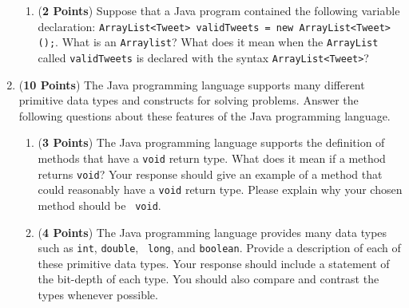 \documentclass[12pt]{article}
\begin{document}
\begin{enumerate}
\begin{enumerate}

% 

\item ({\bf 2 Points}) Suppose that a Java program contained the
  following variable declaration: {\tt ArrayList<Tweet> validTweets =
    new ArrayList<Tweet>();}.  What is an {\tt Arraylist}?  What does
  it mean when the {\tt ArrayList} called {\tt validTweets} is
  declared with the syntax {\tt ArrayList<Tweet>}?

\end{enumerate}

\newpage

\item ({\bf 10 Points}) The Java programming language supports many
  different primitive data types and constructs for solving problems.
  Answer the following questions about these features of the Java
  programming language.

\begin{enumerate}

\item ({\bf 3 Points}) The Java programming language supports the
  definition of methods that have a {\tt void} return type.  What does
  it mean if a method returns {\tt void}?  Your response should give
  an example of a method that could reasonably have a {\tt void}
  return type.  Please explain why your chosen method should be {\tt
    void}.

  
\item ({\bf 4 Points}) The Java programming language provides many data types such as {\tt int}, {\tt double}, {\tt
  long}, and {\tt boolean}.  Provide a description of each of these primitive data types.  Your response should include
  a statement of the bit-depth of each type. You should also compare and contrast the types whenever possible.
  


\end{enumerate}
\end{enumerate}
\end{document}

